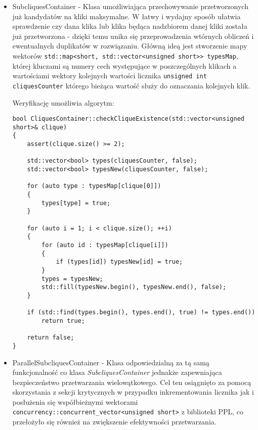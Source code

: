 \documentclass[12pt]{article}
\begin{document}
\begin{itemize}
\item SubcliquesContainer - Klasa umożliwiająca przechowywanie przetworzonych już kandydatów na kliki maksymalne. W łatwy i wydajny sposób ułatwia sprawdzenie czy dana klika lub klika będąca nadzbiorem danej kliki została już przetworzona - dzięki temu unika się przeprowadzenia wtórnych obliczeń i ewentualnych duplikatów w rozwiązaniu. Główną ideą jest stworzenie mapy wektorów \lstinline{std::map<short, std::vector<unsigned short>> typesMap}, której kluczami są numery cech występujące w poszczególnych klikach a wartościami wektory kolejnych wartości licznika \lstinline{unsigned int cliquesCounter} którego bieżąca wartość służy do oznaczania kolejnych klik.

Weryfikację umożliwia algorytm: 
\begin{lstlisting}
bool CliquesContainer::checkCliqueExistence(std::vector<unsigned short>& clique)
{
	assert(clique.size() >= 2);

	std::vector<bool> types(cliquesCounter, false);
	std::vector<bool> typesNew(cliquesCounter, false);

	for (auto type : typesMap[clique[0]])
	{
		types[type] = true;
	}

	for (auto i = 1; i < clique.size(); ++i)
	{
		for (auto id : typesMap[clique[i]])
		{
			if (types[id]) typesNew[id] = true;
		}
		types = typesNew;
		std::fill(typesNew.begin(), typesNew.end(), false);
	}

	if (std::find(types.begin(), types.end(), true) != types.end())
		return true;

	return false;
}
\end{lstlisting}
	
\item ParallelSubcliquesContainer - Klasa odpowiedzialną za tą samą funkcjonalność co klasa \textit{SubcliquesContainer} jednakże zapewniająca bezpieczeństwo przetwarzania wielowątkowego. Cel ten osiągnięto za pomocą skorzystania z sekcji krytycznych w przypadku inkrementowania licznika jak i posłużenia się współbieżnymi wektorami \lstinline{concurrency::concurrent_vector<unsigned short>} z biblioteki PPL, co przełożyło się również na zwiększenie efektywności przetwarzania.


\end{itemize}
\end{document}
